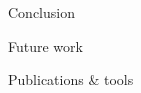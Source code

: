 \documentclass[xcolor=dvipsnames]{beamer}
\begin{document}
\begin{frame}{\large{Conclusion}}
\end{frame}
\begin{frame}{\large{Future work}}
\end{frame}
\begin{frame}{\large{Publications \& tools}}
\end{frame}
\end{document}
